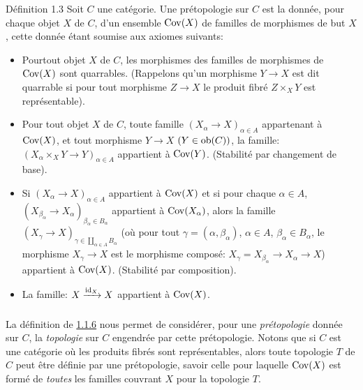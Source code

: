 \documentclass[10pt]{../fichiers-configuration-latex/smfart}
\begin{document}
\begin{enonce*}{Définition 1.3}
Soit $C$ une catégorie. Une prétopologie sur $C$ est la donnée, pour
chaque objet $X$ de $C$, d'un ensemble $\operatorname{Cov}(X)$ de familles de
morphismes de but $X$, cette donnée étant soumise aux axiomes
suivants:
\begin{itemize}
\item[PT 0)] Pour\pageoriginale tout objet $X$ de $C$, les morphismes
  des familles de morphismes de $\operatorname{Cov}(X)$ sont quarrables. (Rappelons
  qu'un morphisme $Y\rightarrow X$ est dit quarrable si pour tout
  morphisme $Z\rightarrow X$ le produit fibré $Z\times_X Y$ est
  représentable).

\item[PT 1)] Pour tout objet $X$ de $C$, toute famille
  $(X_{\alpha}\rightarrow X)_{\alpha \in A}$ appartenant à
  $\operatorname{Cov}(X)$, et tout morphisme $Y\rightarrow X$ $(Y\in \operatorname{ob} (C))$, la
  famille: $(X_{\alpha}\times_X Y\rightarrow Y)_{\alpha \in A}$
  appartient à $\operatorname{Cov}(Y)$. (Stabilité par changement de base).

\item[PT 2)] Si $(X_{\alpha}\rightarrow X)_{\alpha \in A}$ appartient
  à $\operatorname{Cov}(X)$ et si pour chaque $\alpha\in A$,
  $(X_{\beta_{\alpha}}\rightarrow X_{\alpha})_{\beta_{\alpha}\in
  B_{\alpha}}$ appartient à $\operatorname{Cov}(X_{\alpha})$, alors la famille
  $(X_\gamma\rightarrow X)_{\gamma\in \amalg_{\alpha\in A}B_{\alpha}}$ (où
  pour tout $\gamma=(\alpha,\beta_{\alpha})$, $\alpha\in A$,
  $\beta_{\alpha}\in B_{\alpha}$, le morphisme $X_\gamma\rightarrow X$ est
  le morphisme composé: $X_\gamma=X_{\beta_{\alpha}}\rightarrow
  X_{\alpha}\rightarrow X$) appartient à $\operatorname{Cov}(X)$. (Stabilité par
  composition).

\item[PT 3)] La famille: $X\xrightarrow{\operatorname{id}_X} X$ appartient à $\operatorname{Cov}(X)$.
\end{itemize}
\end{enonce*}

\setcounter{subsection}{3} \setcounter{subsubsection}{0}
\subsubsection{}

La définition de \hyperref[II.subsubsec1.1.6]{1.1.6} nous permet de considérer,
pour une \emph{prétopologie} donnée sur $C$, la \emph{topologie} sur
$C$ engendrée par cette prétopologie. Notons que si $C$ est une
catégorie où les produits fibrés sont représentables, alors toute
topologie $T$ de $C$ peut être définie par une prétopologie, savoir
celle pour laquelle $\operatorname{Cov}(X)$ est formé de \emph{toutes} les
familles couvrant $X$ pour la topologie $T$.
\end{document}

